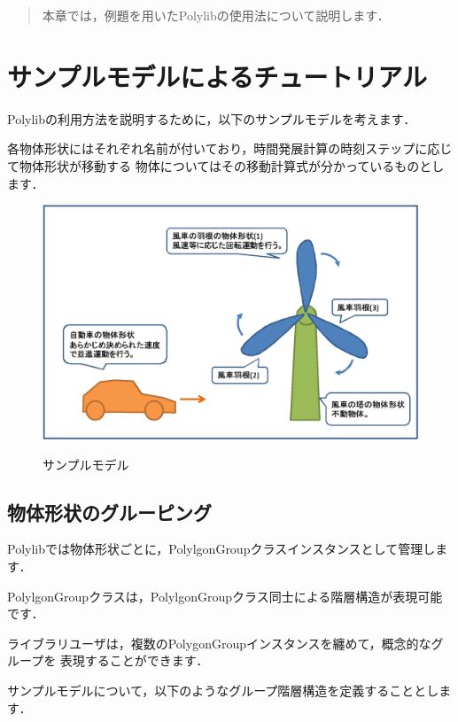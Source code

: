 {\begin{abstract}
本章では，例題を用いたPolylibの使用法について説明します．
\end{abstract}
%

\graphicspath{{./fig_tutorial/}}

%
\section{サンプルモデルによるチュートリアル}
Polylibの利用方法を説明するために，以下のサンプルモデルを考えます．

各物体形状にはそれぞれ名前が付いており，時間発展計算の時刻ステップに応じて物体形状が移動する
物体についてはその移動計算式が分かっているものとします．

\begin{figure}[H]
 \centering
 \includegraphics[scale=0.5]{clip007.eps}\\
 \caption{サンプルモデル}
\end{figure}


%
\subsection{物体形状のグルーピング}

Polylibでは物体形状ごとに，PolylgonGroupクラスインスタンスとして管理します．

PolylgonGroupクラスは，PolylgonGroupクラス同士による階層構造が表現可能です．

ライブラリユーザは，複数のPolygonGroupインスタンスを纏めて，概念的なグループを
表現することができます．

サンプルモデルについて，以下のようなグループ階層構造を定義することとします．

}
